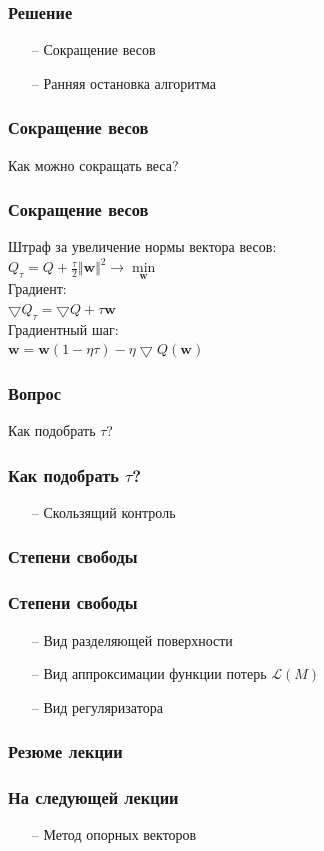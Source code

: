 \documentclass[12pt]{beamer}
\begin{document}
\begin{frame}\frametitle{Решение}
\begin{itemize}
\item[--] Сокращение весов
\item[--] Ранняя остановка алгоритма
\end{itemize}
\end{frame}

\begin{frame}\frametitle{Сокращение весов}
Как можно сокращать веса?
\end{frame}

\begin{frame}\frametitle{Сокращение весов}
Штраф за увеличение нормы вектора весов:\\
$Q_{\tau} = Q + \frac{\tau}{2}\Vert \mathbf{w} \Vert^2 \rightarrow \min\limits_{\mathbf{w}}$\\
\vspace{5mm}
Градиент:\\
$\bigtriangledown Q_{\tau} = \bigtriangledown Q + \tau \mathbf{w}$\\
\vspace{5mm}
Градиентный шаг:\\
$\mathbf{w} = \mathbf{w}(1-\eta \tau) - \eta \bigtriangledown Q(\mathbf{w})$
\end{frame}

\begin{frame}\frametitle{Вопрос}
Как подобрать $\tau$?
\end{frame}

\begin{frame}\frametitle{Как подобрать $\tau$?}
\begin{itemize}
\item[--] Скользящий контроль
\end{itemize}
\end{frame}

\begin{frame}\frametitle{Степени свободы}

\end{frame}

\begin{frame}\frametitle{Степени свободы}
\begin{itemize}
\item[--] Вид разделяющей поверхности
\item[--] Вид аппроксимации функции потерь $\mathcal{L}(M)$
\item[--] Вид регуляризатора
\end{itemize}
\end{frame}

\begin{frame}\frametitle{Резюме лекции}
\end{frame}

\begin{frame}\frametitle{На следующей лекции}
\begin{itemize}
\item[--] Метод опорных векторов
\end{itemize}
\end{frame}
\end{document}
